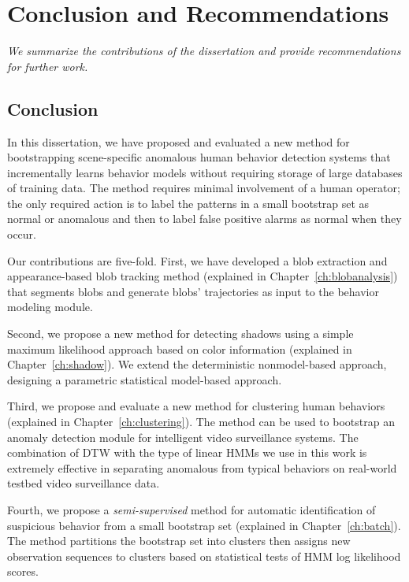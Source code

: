 \setlength{\footskip}{8mm}

\chapter{Conclusion and Recommendations}
\label{ch:conclusion}

\textit{We summarize the contributions of the dissertation and
provide recommendations for further work.}

\section{Conclusion}

In this dissertation, we have proposed and evaluated a new method for
bootstrapping scene-specific anomalous human behavior detection
systems that incrementally learns behavior models without requiring
storage of large databases of training data. The method requires
minimal involvement of a human operator; the only required action is
to label the patterns in a small bootstrap set as normal or anomalous
and then to label false positive alarms as normal when they occur.

Our contributions are five-fold. First, we have developed a blob
extraction and appearance-based blob tracking method (explained in
Chapter~\ref{ch:blobanalysis}) that segments blobs and generate blobs'
trajectories as input to the behavior modeling module.

Second, we propose a new method for detecting shadows using a simple
maximum likelihood approach based on color information (explained in
Chapter~\ref{ch:shadow}). We extend the deterministic nonmodel-based
approach, designing a parametric statistical model-based approach.

Third, we propose and evaluate a new method for clustering human
behaviors (explained in Chapter~\ref{ch:clustering}). The method can
be used to bootstrap an anomaly detection module for intelligent video
surveillance systems. The combination of DTW with the type of linear
HMMs we use in this work is extremely effective in separating
anomalous from typical behaviors on real-world testbed video
surveillance data.

Fourth, we propose a \textit{semi-supervised} method for automatic
identification of suspicious behavior from a small bootstrap set
(explained in Chapter~\ref{ch:batch}). The method partitions the
bootstrap set into clusters then assigns new observation sequences to
clusters based on statistical tests of HMM log likelihood scores.

